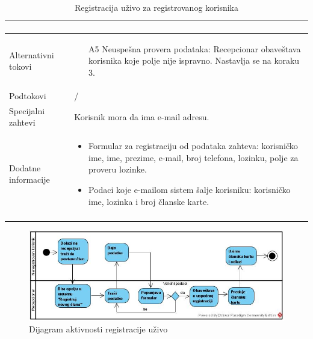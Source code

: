 \documentclass[../main.tex]{subfiles}
\begin{document}
\begin{longtable}{| p{} | p{} |}
\begin{enumerate}
    \end{enumerate}\\
\hline
    Alternativni tokovi & \begin{itemize}
        \item[A5] Neuspešna provera podataka: Recepcionar obaveštava korisnika koje polje nije ispravno. Nastavlja se na koraku 3.
    \end{itemize}\\
\hline
    Podtokovi & /\\
\hline
    Specijalni zahtevi & Korisnik mora da ima e-mail adresu.\\
\hline
    Dodatne informacije & \begin{itemize}
        \item Formular za registraciju od podataka zahteva: korisničko ime, ime, prezime, e-mail, broj telefona, lozinku, polje za proveru lozinke.
        \item Podaci koje e-mailom sistem šalje korisniku: korisničko ime, lozinka i broj članske karte.
    \end{itemize} \\
\hline
\caption{Registracija uživo za registrovanog korisnika} %
\end{longtable}


\begin{figure}[!ht]
\begin{center}
\includegraphics[scale=0.55]{sections/images/Dijagram_aktivnsti_registracije_uzivo.jpg}
\end{center}
\caption{Dijagram aktivnosti registracije uživo}
\label{fig:kontekst}
\end{figure}
\end{document}
